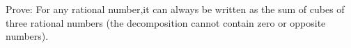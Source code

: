 \documentclass[preview]{standalone}
\begin{document}
\begin{center}
Prove: For any rational number,it can always be written as the sum of cubes of three rational numbers (the decomposition cannot contain zero or opposite numbers).
\end{center}
\end{document}
